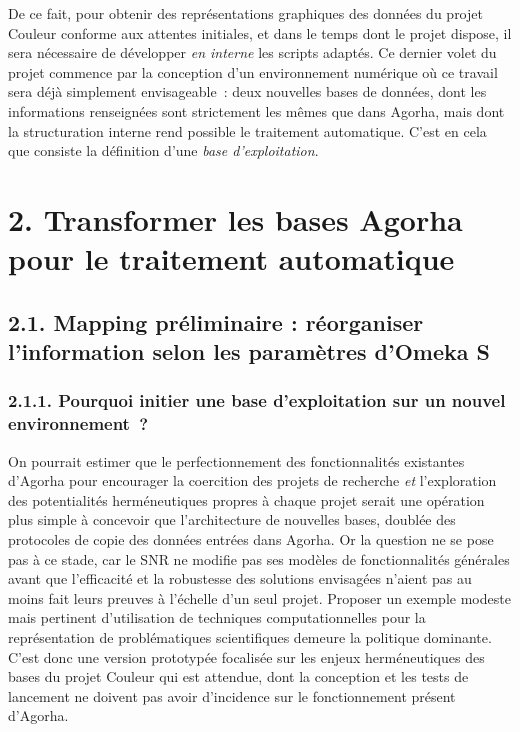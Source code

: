 \documentclass[a4paper,12pt, twoside]{book}
\begin{document}
De ce fait, pour obtenir des représentations graphiques des données du projet Couleur conforme aux attentes initiales, et dans le temps dont le projet dispose, il sera nécessaire de développer \textit{en interne} les scripts adaptés. Ce dernier volet du projet commence par la conception d’un environnement numérique où ce travail sera déjà simplement envisageable~: deux nouvelles bases de données, dont les informations renseignées sont strictement les mêmes que dans Agorha, mais dont la structuration interne rend possible le traitement automatique. C’est en cela que consiste la définition d’une \textit{base d’exploitation}.

\clearemptydoublepage
\chapter*{2. Transformer les bases Agorha pour le traitement automatique}

\section*{2.1. Mapping préliminaire : réorganiser l'information selon les paramètres d’Omeka S}

\subsection*{2.1.1. Pourquoi initier une base d’exploitation sur un nouvel environnement~?}

On pourrait estimer que le perfectionnement des fonctionnalités existantes d’Agorha pour encourager la coercition des projets de recherche \textit{et} l’exploration des potentialités herméneutiques propres à chaque projet serait une opération plus simple à concevoir que l’architecture de nouvelles bases, doublée des protocoles de copie des données entrées dans Agorha. Or la question ne se pose pas à ce stade, car le SNR ne modifie pas ses modèles de fonctionnalités générales avant que l’efficacité et la robustesse des solutions envisagées n’aient pas au moins fait leurs preuves à l’échelle d’un seul projet. Proposer un exemple modeste mais pertinent d’utilisation de techniques computationnelles pour la représentation de problématiques scientifiques demeure la politique dominante. C’est donc une version prototypée focalisée sur les enjeux herméneutiques des bases du projet Couleur qui est attendue, dont la conception et les tests de lancement  ne doivent pas avoir d’incidence sur le fonctionnement présent d’Agorha.
\end{document}
